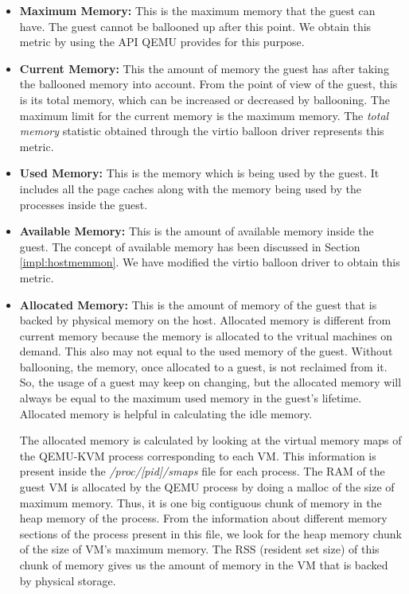 \begin{itemize}
\item \textbf{Maximum Memory:} This is the maximum memory that the guest can have. The guest cannot be ballooned up after this point. We obtain this metric by using the API QEMU provides for this purpose.
\item \textbf{Current Memory:} This the amount of memory the guest has after taking the ballooned memory into account. From the point of view of the guest, this is its total memory, which can be increased or decreased by ballooning. The maximum limit for the current memory is the maximum memory. The \textit{total memory} statistic obtained through the virtio balloon driver represents this metric.
\item \textbf{Used Memory:} This is the memory which is being used by the guest. It includes all the page caches along with the memory being used by the processes inside the guest.
\item \textbf{Available Memory:} This is the amount of available memory inside the guest. The concept of available memory has been discussed in Section \ref{impl:hostmemmon}. We have modified the virtio balloon driver to obtain this metric.
\item \textbf{Allocated Memory:} This is the amount of memory of the guest that is backed by physical memory on the host. Allocated memory is different from current memory because the memory is allocated to the vritual machines on demand. This also may not equal to the used memory of the guest. Without ballooning, the memory, once allocated to a guest, is not reclaimed from it. So, the usage of a guest may keep on changing, but the allocated memory will always be equal to the maximum used memory in the guest's lifetime. Allocated memory is helpful in calculating the idle memory.

The allocated memory is calculated by looking at the virtual memory maps of the QEMU-KVM process corresponding to each VM. This information is present inside the \textit{/proc/[pid]/smaps} file \cite{procfs} for each process. The RAM of the guest VM is allocated by the QEMU process by doing a malloc of the size of maximum memory. Thus, it is one big contiguous chunk of memory in the heap memory of the process. From the information about different memory sections of the process present in this file, we look for the heap memory chunk of the size of VM's maximum memory. The RSS (resident set size) of this chunk of memory gives us the amount of memory in the VM that is backed by physical storage. 


\end{itemize}
